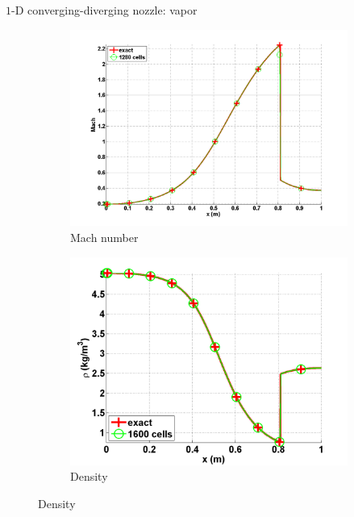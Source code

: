 \documentclass[xcolor=dvipsnames,10pt]{beamer}
\begin{document}
\begin{frame}{$1$-D converging-diverging nozzle: vapor}
\begin{figure}[H]
        \centering
        \begin{subfigure}[b]{0.37\textwidth}
                \centering
                \includegraphics[width=\textwidth]{../figures/vapor_mach_numerical_and_exact_1280.png}
                \caption{Mach number}
        \end{subfigure}%
        \begin{subfigure}[b]{0.37\textwidth}
                \centering
                \includegraphics[width=\textwidth]{../figures/vapor_density_numerical_and_exact_1600.png}
                \caption{Density}
        \end{subfigure}


\end{figure}
\end{frame}
\end{document}

